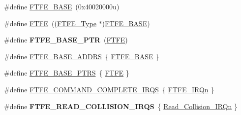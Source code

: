 \begin{DoxyCompactItemize}
\item 
\#define \hyperlink{group__FTFE__Peripheral__Access__Layer_ga78ffb1457d354ca3ed49ee1b93b78193}{F\+T\+F\+E\+\_\+\+B\+A\+SE}~(0x40020000u)
\item 
\#define \hyperlink{group__FTFE__Peripheral__Access__Layer_ga08e0af7718eb3edb5211071bc350605c}{F\+T\+FE}~((\hyperlink{structFTFE__Type}{F\+T\+F\+E\+\_\+\+Type} $\ast$)\hyperlink{group__FTFE__Peripheral__Access__Layer_ga78ffb1457d354ca3ed49ee1b93b78193}{F\+T\+F\+E\+\_\+\+B\+A\+SE})
\item 
\#define {\bfseries F\+T\+F\+E\+\_\+\+B\+A\+S\+E\+\_\+\+P\+TR}~(\hyperlink{group__FTFE__Peripheral__Access__Layer_ga08e0af7718eb3edb5211071bc350605c}{F\+T\+FE})\hypertarget{group__FTFE__Peripheral__Access__Layer_ga459f4097b9fd3f09e7bf790c17831f83}{}\label{group__FTFE__Peripheral__Access__Layer_ga459f4097b9fd3f09e7bf790c17831f83}

\item 
\#define \hyperlink{group__FTFE__Peripheral__Access__Layer_gae4cbd5858122e7e88e3e6227507954ad}{F\+T\+F\+E\+\_\+\+B\+A\+S\+E\+\_\+\+A\+D\+D\+RS}~\{ \hyperlink{group__FTFE__Peripheral__Access__Layer_ga78ffb1457d354ca3ed49ee1b93b78193}{F\+T\+F\+E\+\_\+\+B\+A\+SE} \}
\item 
\#define \hyperlink{group__FTFE__Peripheral__Access__Layer_ga5ae2dee20c785365da3d603faf7a1dd2}{F\+T\+F\+E\+\_\+\+B\+A\+S\+E\+\_\+\+P\+T\+RS}~\{ \hyperlink{group__FTFE__Peripheral__Access__Layer_ga08e0af7718eb3edb5211071bc350605c}{F\+T\+FE} \}
\item 
\#define \hyperlink{group__FTFE__Peripheral__Access__Layer_gaaac748d7395492209690894787db8ce0}{F\+T\+F\+E\+\_\+\+C\+O\+M\+M\+A\+N\+D\+\_\+\+C\+O\+M\+P\+L\+E\+T\+E\+\_\+\+I\+R\+QS}~\{ \hyperlink{group__Interrupt__vector__numbers_gga666eb0caeb12ec0e281415592ae89083abaa48ed6ed98d36e090f1d18dff97da2}{F\+T\+F\+E\+\_\+\+I\+R\+Qn} \}
\item 
\#define {\bfseries F\+T\+F\+E\+\_\+\+R\+E\+A\+D\+\_\+\+C\+O\+L\+L\+I\+S\+I\+O\+N\+\_\+\+I\+R\+QS}~\{ \hyperlink{group__Interrupt__vector__numbers_gga666eb0caeb12ec0e281415592ae89083aa3caf4837979a4a300de12aa1ec8fc74}{Read\+\_\+\+Collision\+\_\+\+I\+R\+Qn} \}\hypertarget{group__FTFE__Peripheral__Access__Layer_gaf8570868b30e7a06fe146f27610363d9}{}\label{group__FTFE__Peripheral__Access__Layer_gaf8570868b30e7a06fe146f27610363d9}

\end{DoxyCompactItemize}
